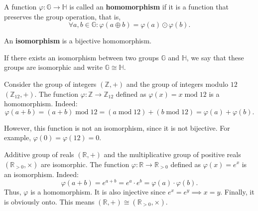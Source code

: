 \documentclass[../lecture-notes.tex]{subfiles}
\begin{document}
\begin{definition}
    A function $\varphi: \mathbb{G} \to \mathbb{H}$ is called an \textbf{homomorphism} if it is a function that preserves the group operation, that is, 
    \begin{equation}
        \forall a,b \in \mathbb{G}: \varphi(a \oplus b) = \varphi(a) \odot \varphi(b).
    \end{equation}
\end{definition}

\begin{definition}
    An \textbf{isomorphism} is a bijective homomorphism.
\end{definition}

\begin{definition}
    If there exists an isomorphism between two groups $\mathbb{G}$ and $\mathbb{H}$, we say that these groups are isomorphic and write $\mathbb{G} \cong \mathbb{H}$.
\end{definition}

\begin{example}
    Consider the group of integers $(\mathbb{Z},+)$ and the group of integers modulo $12$ $(\mathbb{Z}_{12},+)$. The function $\varphi: \mathbb{Z} \to \mathbb{Z}_{12}$ defined as $\varphi(x) = x \;\text{mod}\; 12$ is a homomorphism. Indeed:
    \begin{equation}
        \varphi(a+b) = (a+b) \;\text{mod}\; 12 = (a \;\text{mod}\; 12) + (b \;\text{mod}\; 12) = \varphi(a) + \varphi(b).
    \end{equation}

    However, this function is not an isomorphism, since it is not bijective. For example, $\varphi(0) = \varphi(12) = 0$.
\end{example}

\begin{example}
    Additive group of reals $(\mathbb{R}, +)$ and the multiplicative group of positive reals $(\mathbb{R}_{>0}, \times)$ are isomorphic. The function $\varphi: \mathbb{R} \to \mathbb{R}_{>0}$ defined as $\varphi(x) = e^x$ is an isomorphism. Indeed:
    \begin{equation}
        \varphi(a+b) = e^{a+b} = e^a \cdot e^b = \varphi(a) \cdot \varphi(b).
    \end{equation}
    Thus, $\varphi$ is a homomorphism. It is also injective since $e^x = e^y \implies x=y$. Finally, it is obviously onto. This means $(\mathbb{R}, +) \cong (\mathbb{R}_{>0}, \times)$.
\end{example}
\end{document}
